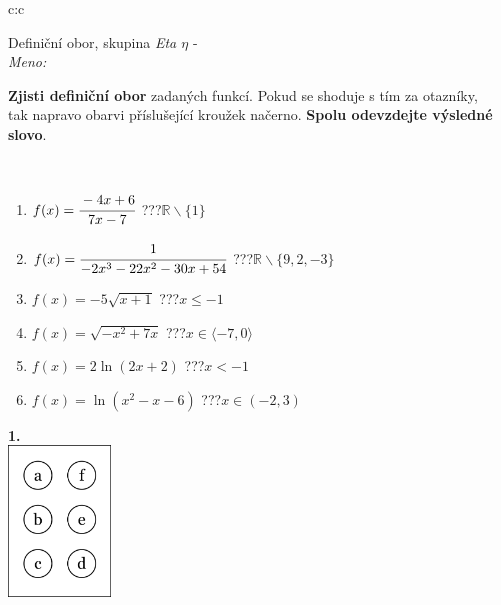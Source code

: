 \documentclass[10pt]{report}
\begin{document}
\begin{tabular}{c:c}
\begin{minipage}[c][104.5mm][t]{0.5\linewidth}
\begin{center}
\vspace{7mm}
{\huge Definiční obor, skupina \textit{Eta $\eta$} -}\\[5mm]
\textit{Meno:}\phantom{xxxxxxxxxxxxxxxxxxxxxxxxxxxxxxxxxxxxxxxxxxxxxxxxxxxxxxxxxxxxxxxxx}\\[5mm]
\begin{minipage}{0.95\linewidth}
\textbf{Zjisti definiční obor} zadaných funkcí. Pokud se shoduje s tím za otazníky,\\tak napravo obarvi příslušející kroužek načerno. \textbf{Spolu odevzdejte výsledné slovo}.
\end{minipage}
\\[1mm]
\begin{minipage}{0.79\linewidth}
\begin{center}
\begin{varwidth}{\linewidth}
\begin{enumerate}
\normalsizerrr
\item $f(x)=\cfrac{-4x+6}{7x-7}$\quad \dotfill\; ???\;\dotfill \quad $\mathbb{R}\smallsetminus\{1\}$
\item $f(x)=\cfrac{1}{-2x^3-22x^2-30x+54}$\quad \dotfill\; ???\;\dotfill \quad $\mathbb{R}\smallsetminus\{9,2,-3\}$
\item $f(x)=-5\sqrt{x+1}$\quad \dotfill\; ???\;\dotfill \quad $x\leq-1$
\item $f(x)=\sqrt{-x^2+7x}$\quad \dotfill\; ???\;\dotfill \quad $x\in\langle-7 , 0\rangle$
\item $f(x)=2\ln{(2x+2)}$\quad \dotfill\; ???\;\dotfill \quad $x<-1$
\item $f(x)=\ln{(x^2-x-6)}$\quad \dotfill\; ???\;\dotfill \quad $x\in(-2 , 3)$
\end{enumerate}
\end{varwidth}
\end{center}
\end{minipage}
\begin{minipage}{0.20\linewidth}
\begin{center}
{\Huge\bfseries 1.} \\[2mm]
\includegraphics[height=40mm]{../images/braille.png}

\end{center}
\end{minipage}
\end{center}
\end{minipage}
\end{tabular}
\end{document}

